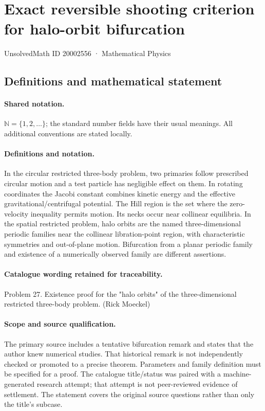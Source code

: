 \documentclass[11pt]{article}
\begin{document}
\setcounter{section}{20002555}
\section{Exact reversible shooting criterion for halo-orbit bifurcation}\label{20002556}
{\small UnsolvedMath ID 20002556 · Mathematical Physics}
\subsection{Definitions and mathematical statement}

\paragraph{Shared notation.}$\mathbb N=\{1,2,\ldots\}$; the standard number fields have their usual meanings. All additional conventions are stated locally.


\paragraph{Definitions and notation.}In the circular restricted three-body problem, two primaries follow prescribed circular motion and a test particle has negligible effect on them. In rotating coordinates the Jacobi constant combines kinetic energy and the effective gravitational/centrifugal potential. The Hill region is the set where the zero-velocity inequality permits motion. Its necks occur near collinear equilibria. In the spatial restricted problem, halo orbits are the named three-dimensional periodic families near the collinear libration-point region, with characteristic symmetries and out-of-plane motion. Bifurcation from a planar periodic family and existence of a numerically observed family are different assertions.

\paragraph{Catalogue wording retained for traceability.}
Problem 27. Existence proof for the "halo orbits" of the three-dimensional restricted three-body problem. (Rick Moeckel)
\paragraph{Scope and source qualification.}The primary source includes a tentative bifurcation remark and states that the author knew numerical studies. That historical remark is not independently checked or promoted to a precise theorem. Parameters and family definition must be specified for a proof. The catalogue title/status was paired with a machine-generated research attempt; that attempt is not peer-reviewed evidence of settlement. The statement covers the original source questions rather than only the title’s subcase.
\end{document}
